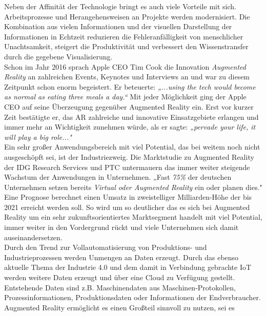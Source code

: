 Neben der Affinität der Technologie bringt es auch viele Vorteile mit sich. Arbeitsprozesse und Herangehensweisen an Projekte werden 
modernisiert. Die Kombination aus vielen Informationen und der visuellen Darstellung der Informationen in Echtzeit reduzieren die 
Fehleranfälligkeit von menschlicher Unachtsamkeit, steigert die Produktivität und verbessert den Wissenstransfer durch die gegebene 
Visualisierung. 
\\ 
\linebreak
Schon im Jahr 2016 sprach Apple CEO Tim Cook die Innovation \textit{Augmented Reality} an zahlreichen Events, Keynotes und Interviews 
an und war zu diesem Zeitpunkt schon enorm begeistert. Er beteuerte: \textit{„...using the tech would become as normal as eating three 
meals a day.“} \cite{timcook2016.2016o} Mit jeder Möglichkeit ging der Apple CEO auf seine Überzeugung gegenüber Augmented Reality ein. 
Erst vor kurzer Zeit bestätigte er, das AR zahlreiche und innovative Einsatzgebiete erlangen und immer mehr an Wichtigkeit zunehmen 
würde, als er sagte: \textit{„pervade your life, it will play a big role..."} \cite{timcook.2020j} 
\\ 
\linebreak
Ein sehr großer Anwendungsbereich mit viel Potential, das bei weitem noch nicht ausgeschöpft sei, ist der Industriezweig. Die 
Marktstudie zu Augmented Reality der IDG Research Services und PTC untermauern das immer weiter steigende Wachstum der Anwendungen in 
Unternehmen. „Fast \textit{75\%} der deutschen Unternehmen setzen bereits \textit{Virtual oder Augmented Reality} ein oder planen dies." 
\cite{studieptc.2020j} Eine Prognose berechnet einen Umsatz in zweistelliger Milliarden-Höhe der bis 2021 erreicht werden soll. So wird 
um so deutlicher das es sich bei Augmented Reality um ein sehr zukunftsorientiertes Marktsegment handelt mit viel Potential, immer 
weiter in den Vordergrund rückt und viele Unternehmen sich damit auseinandersetzen.
\\ 
\linebreak
Durch den Trend zur Vollautomatisierung von Produktions- und Industrieprozessen werden Unmengen an Daten erzeugt. Durch das ebenso 
aktuelle Thema der Industrie 4.0 und dem damit in Verbindung gebrachte \ac{IoT} werden weitere Daten erzeugt und über eine Cloud zu 
Verfügung gestellt. Entstehende Daten sind z.B. Maschinendaten aus Maschinen-Protokollen, Prozessinformationen, Produktionsdaten oder 
Informationen der Endverbraucher. \cite{industrie40.2019f} Augmented Reality ermöglicht es einen Großteil sinnvoll zu nutzen, sei es 
